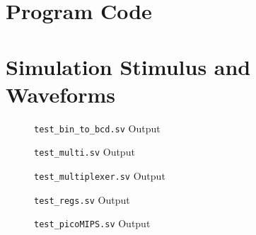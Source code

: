 \clearpage
\begin{appendices}
	
\section{Program Code} \label{app:prog-code}
	



\section{Simulation Stimulus and Waveforms} \label{app:sim-waveforms}




\begin{figure}[ht]
	\centering
	
	\caption{\texttt{test\_bin\_to\_bcd.sv} Output}
	\label{fig:test-bin-bcd}
\end{figure}



\begin{figure}[ht]
	\centering
	
	\caption{\texttt{test\_multi.sv} Output}
	\label{fig:test-multi}
\end{figure}



\begin{figure}[ht]
	\centering
	
	\caption{\texttt{test\_multiplexer.sv} Output}
	\label{fig:test-mux}
\end{figure}



\begin{figure}[ht]
	\centering
	
	\caption{\texttt{test\_regs.sv} Output}
	\label{fig:test-regs}
\end{figure}



\begin{figure}[ht]
	\centering
	
	\caption{\texttt{test\_picoMIPS.sv} Output}
	\label{fig:test-picomips}
\end{figure}

\end{appendices}